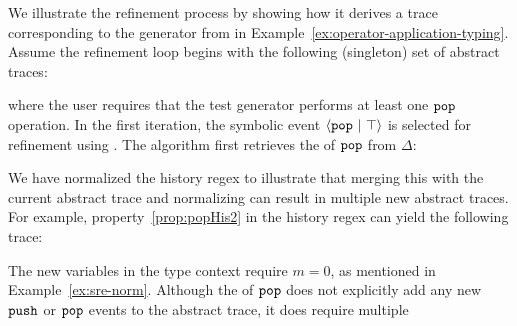 \begin{example}\label{ex:refinement-process}
  We illustrate the refinement process by showing how it derives a
  trace corresponding to the generator from in
  Example~\ref{ex:operator-application-typing}. Assume the refinement
  loop begins with the following (singleton) set of abstract traces:
  \vspace{-.4cm} \par{}\noindent
  where the user requires that the test generator performs at least
  one $\boldsymbol{{\tt pop}}$ operation.  In the first iteration, the symbolic
  event ${\langle} {\boldsymbol{{\tt pop}}~|~{\top}} {\rangle}$ is selected for refinement using
  . The algorithm first retrieves the \tyName{} of
  $\boldsymbol{{\tt pop}}$ from $\Delta$: %
  \vspace{-.4cm} \par{}%
  \noindent We have normalized the history regex to illustrate that
  merging this \tyName{} with the current abstract trace and
  normalizing can result in multiple new abstract traces.  For
  example, property~\ref{prop:popHis2} in the history regex can yield
  the following trace: %
  \vspace{-.4cm} \par{} \vspace{-.4cm} \par\nobreak\noindent
The new variables in the type context require $m = 0$, as
mentioned in Example~\ref{ex:sre-norm}.  Although the \tyName{} of
$\boldsymbol{{\tt pop}}$ does not explicitly add any new $\boldsymbol{{\tt push}}$ or
$\boldsymbol{{\tt pop}}$ events to the abstract trace, it does require multiple

\end{example}

